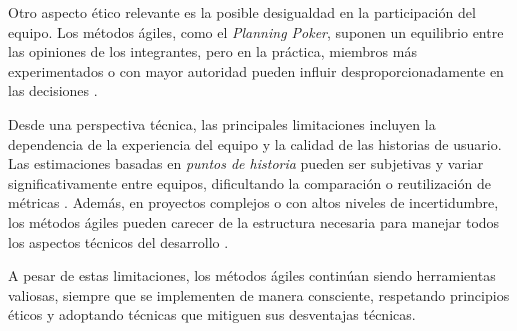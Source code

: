 Otro aspecto ético relevante es la posible desigualdad en la participación del equipo. Los métodos ágiles, como el \textit{Planning Poker}, suponen un equilibrio entre las opiniones de los integrantes, pero en la práctica, miembros más experimentados o con mayor autoridad pueden influir desproporcionadamente en las decisiones \parencite{rubin2012essential}.

Desde una perspectiva técnica, las principales limitaciones incluyen la dependencia de la experiencia del equipo y la calidad de las historias de usuario. Las estimaciones basadas en \textit{puntos de historia} pueden ser subjetivas y variar significativamente entre equipos, dificultando la comparación o reutilización de métricas \parencite{larman2004agile}. Además, en proyectos complejos o con altos niveles de incertidumbre, los métodos ágiles pueden carecer de la estructura necesaria para manejar todos los aspectos técnicos del desarrollo \parencite{boehm2020software}.

A pesar de estas limitaciones, los métodos ágiles continúan siendo herramientas valiosas, siempre que se implementen de manera consciente, respetando principios éticos y adoptando técnicas que mitiguen sus desventajas técnicas.
